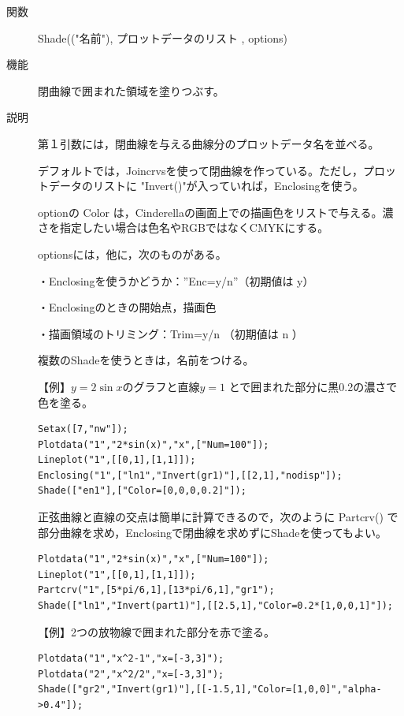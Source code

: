 \documentclass[papersize,a4paper,12pt,uplatex]{jsarticle}
\begin{document}
\begin{description}
\vspace{\baselineskip}
\hypertarget{shade}{}
\item[関数]Shade(("名前"), プロットデータのリスト , options)
\item[機能]閉曲線で囲まれた領域を塗りつぶす。
\item[説明]第１引数には，閉曲線を与える曲線分のプロットデータ名を並べる。

デフォルトでは，Joincrvsを使って閉曲線を作っている。ただし，プロットデータのリストに
"Invert()"が入っていれば，Enclosingを使う。

optionの Color は，Cinderellaの画面上での描画色をリストで与える。濃さを指定したい場合は色名やRGBではなくCMYKにする。

optionsには，他に，次のものがある。

・Enclosingを使うかどうか：''Enc=y/n''（初期値は y）

・Enclosingのときの開始点，描画色

・描画領域のトリミング：Trim=y/n （初期値は n ）

複数のShadeを使うときは，名前をつける。

\vspace{\baselineskip}
【例】$y=2\sin x$のグラフと直線$y=1$ とで囲まれた部分に黒0.2の濃さで色を塗る。
\begin{verbatim}
Setax([7,"nw"]);
Plotdata("1","2*sin(x)","x",["Num=100"]);
Lineplot("1",[[0,1],[1,1]]);
Enclosing("1",["ln1","Invert(gr1)"],[[2,1],"nodisp"]);
Shade(["en1"],["Color=[0,0,0,0.2]"]);
\end{verbatim}
\begin{center}  \end{center}

正弦曲線と直線の交点は簡単に計算できるので，次のように Partcrv() で部分曲線を求め，Enclosingで閉曲線を求めずにShadeを使ってもよい。
\begin{verbatim}
Plotdata("1","2*sin(x)","x",["Num=100"]);
Lineplot("1",[[0,1],[1,1]]);
Partcrv("1",[5*pi/6,1],[13*pi/6,1],"gr1");
Shade(["ln1","Invert(part1)"],[[2.5,1],"Color=0.2*[1,0,0,1]"]);
\end{verbatim}


\vspace{\baselineskip}
【例】2つの放物線で囲まれた部分を赤で塗る。
\begin{verbatim}
Plotdata("1","x^2-1","x=[-3,3]");
Plotdata("2","x^2/2","x=[-3,3]");
Shade(["gr2","Invert(gr1)"],[[-1.5,1],"Color=[1,0,0]","alpha->0.4"]);
\end{verbatim}


\end{description}
\end{document}
